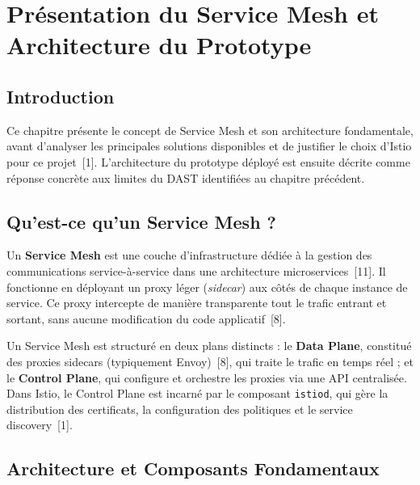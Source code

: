 
\chapter{Présentation du Service Mesh et Architecture du Prototype}

\section*{Introduction}
\label{sec:introduction-ch2}

Ce chapitre présente le concept de Service Mesh et son architecture fondamentale,
avant d'analyser les principales solutions disponibles et de justifier le choix
d'Istio pour ce projet~[1]. L'architecture du prototype déployé est ensuite décrite
comme réponse concrète aux limites du DAST identifiées au chapitre précédent.

\section{Qu'est-ce qu'un Service Mesh ?}

Un \textbf{Service Mesh} est une couche d'infrastructure dédiée à la gestion des
communications service-à-service dans une architecture microservices~[11]. Il
fonctionne en déployant un proxy léger (\textit{sidecar}) aux côtés de chaque
instance de service. Ce proxy intercepte de manière transparente tout le trafic
entrant et sortant, sans aucune modification du code applicatif~[8].

Un Service Mesh est structuré en deux plans distincts : le \textbf{Data Plane},
constitué des proxies sidecars (typiquement Envoy)~[8], qui traite le trafic en
temps réel ; et le \textbf{Control Plane}, qui configure et orchestre les proxies
via une API centralisée. Dans Istio, le Control Plane est incarné par le composant
\texttt{istiod}, qui gère la distribution des certificats, la configuration des
politiques et le service discovery~[1].

\section{Architecture et Composants Fondamentaux}


